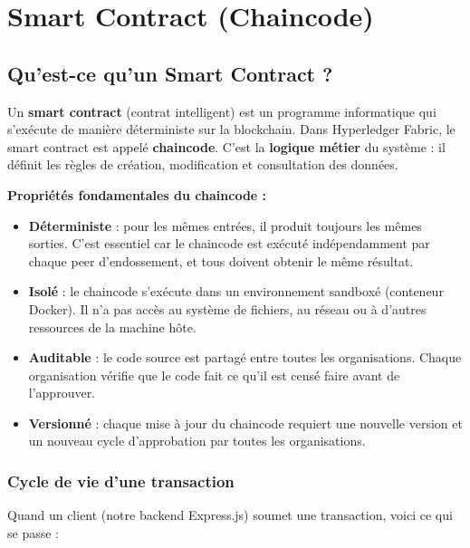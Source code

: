 \documentclass[12pt,a4paper,twoside]{report}
\begin{document}
\chapter{Smart Contract (Chaincode)}

\section{Qu'est-ce qu'un Smart Contract ?}

Un \textbf{smart contract} (contrat intelligent) est un programme informatique qui s'exécute de manière déterministe sur la blockchain. Dans Hyperledger Fabric, le smart contract est appelé \textbf{chaincode}. C'est la \textbf{logique métier} du système : il définit les règles de création, modification et consultation des données.

\begin{infobox}
\textbf{Propriétés fondamentales du chaincode :}
\begin{itemize}
    \item \textbf{Déterministe} : pour les mêmes entrées, il produit toujours les mêmes sorties. C'est essentiel car le chaincode est exécuté indépendamment par chaque peer d'endossement, et tous doivent obtenir le même résultat.
    \item \textbf{Isolé} : le chaincode s'exécute dans un environnement sandboxé (conteneur Docker). Il n'a pas accès au système de fichiers, au réseau ou à d'autres ressources de la machine hôte.
    \item \textbf{Auditable} : le code source est partagé entre toutes les organisations. Chaque organisation vérifie que le code fait ce qu'il est censé faire avant de l'approuver.
    \item \textbf{Versionné} : chaque mise à jour du chaincode requiert une nouvelle version et un nouveau cycle d'approbation par toutes les organisations.
\end{itemize}
\end{infobox}

\subsection{Cycle de vie d'une transaction}

Quand un client (notre backend Express.js) soumet une transaction, voici ce qui se passe :
\end{document}
